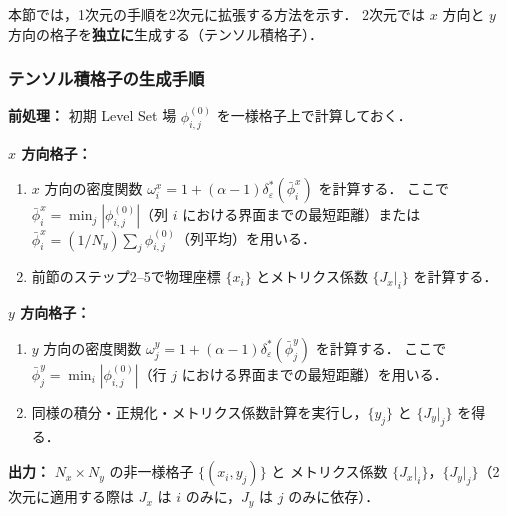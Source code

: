 本節では，1次元の手順を2次元に拡張する方法を示す．
2次元では $x$ 方向と $y$ 方向の格子を\textbf{独立に}生成する（テンソル積格子）．

\subsubsection{テンソル積格子の生成手順}

\begin{tcolorbox}[algbox, title={2次元格子点生成アルゴリズム（テンソル積）}]
\textbf{前処理：} 初期 Level Set 場 $\phi^{(0)}_{i,j}$ を一様格子上で計算しておく．

\textbf{$x$ 方向格子：}
\begin{enumerate}
  \item $x$ 方向の密度関数 $\omega^x_i = 1 + (\alpha-1)\delta_\varepsilon^*(\bar{\phi}^x_i)$ を計算する．
        ここで $\bar{\phi}^x_i = \min_j |\phi^{(0)}_{i,j}|$（列 $i$ における界面までの最短距離）または
        $\bar{\phi}^x_i = (1/N_y)\sum_j \phi^{(0)}_{i,j}$（列平均）を用いる．
  \item 前節のステップ2--5で物理座標 $\{x_i\}$ とメトリクス係数 $\{J_x|_i\}$ を計算する．
\end{enumerate}

\textbf{$y$ 方向格子：}
\begin{enumerate}
  \item $y$ 方向の密度関数 $\omega^y_j = 1 + (\alpha-1)\delta_\varepsilon^*(\bar{\phi}^y_j)$ を計算する．
        ここで $\bar{\phi}^y_j = \min_i |\phi^{(0)}_{i,j}|$（行 $j$ における界面までの最短距離）を用いる．
  \item 同様の積分・正規化・メトリクス係数計算を実行し，$\{y_j\}$ と $\{J_y|_j\}$ を得る．
\end{enumerate}

\textbf{出力：} $N_x \times N_y$ の非一様格子 $\{(x_i, y_j)\}$ と
メトリクス係数 $\{J_x|_i\}$，$\{J_y|_j\}$（2次元に適用する際は $J_x$ は $i$ のみに，$J_y$ は $j$ のみに依存）．
\end{tcolorbox}

